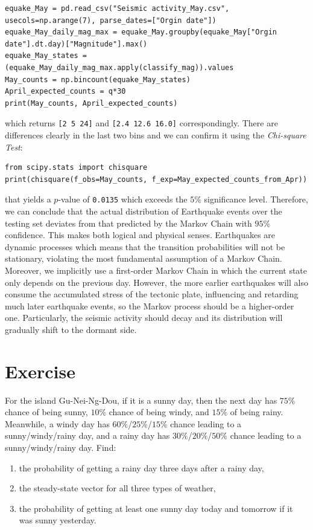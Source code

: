 \begin{lstlisting}
equake_May = pd.read_csv("Seismic activity_May.csv", usecols=np.arange(7), parse_dates=["Orgin date"])
equake_May_daily_mag_max = equake_May.groupby(equake_May["Orgin date"].dt.day)["Magnitude"].max()
equake_May_states = (equake_May_daily_mag_max.apply(classify_mag)).values
May_counts = np.bincount(equake_May_states)
April_expected_counts = q*30
print(May_counts, April_expected_counts)
\end{lstlisting}
which returns \verb|[2 5 24]| and \verb|[2.4 12.6 16.0]| correspondingly. There are differences clearly in the last two bins and we can confirm it using the \textit{Chi-square Test}:
\begin{lstlisting}
from scipy.stats import chisquare
print(chisquare(f_obs=May_counts, f_exp=May_expected_counts_from_Apr))    
\end{lstlisting}
that yields a $p$-value of \verb|0.0135| which exceeds the $5\%$ significance level. Therefore, we can conclude that the actual distribution of Earthquake events over the testing set deviates from that predicted by the Markov Chain with $95\%$ confidence. This makes both logical and physical senses. Earthquakes are dynamic processes which means that the transition probabilities will not be stationary, violating the most fundamental assumption of a Markov Chain. Moreover, we implicitly use a first-order Markov Chain in which the current state only depends on the previous day. However, the more earlier earthquakes will also consume the accumulated stress of the tectonic plate, influencing and retarding much later earthquake events, so the Markov process should be a higher-order one. Particularly, the seismic activity should decay and its distribution will gradually shift to the dormant side.

\section{Exercise}

\begin{Exercise}
For the island Gu-Nei-Ng-Dou, if it is a sunny day, then the next day has $75\%$ chance of being sunny, $10\%$ chance of being windy, and $15\%$ of being rainy. Meanwhile, a windy day has $60\%$/$25\%$/$15\%$ chance leading to a sunny/windy/rainy day, and a rainy day has $30\%$/$20\%$/$50\%$ chance leading to a sunny/windy/rainy day. Find:
\begin{enumerate}[label=(\alph*)]
\item the probability of getting a rainy day three days after a rainy day,
\item the steady-state vector for all three types of weather,
\item the probability of getting at least one sunny day today and tomorrow if it was sunny yesterday.
\end{enumerate}
\end{Exercise}

